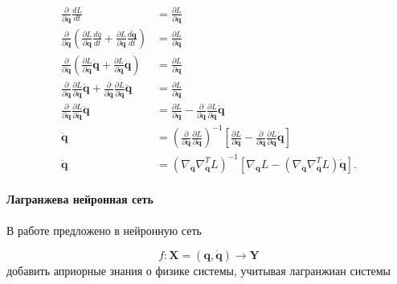 \documentclass[12pt, twoside]{article}
\begin{document}
        $$\begin{aligned}
            \frac{\partial}{\partial \dot{\mathbf{q}}} \frac{dL}{dt} &= \frac{\partial L}{\partial \mathbf{q}}\\
            \frac{\partial}{\partial \dot{\mathbf{q}}} \left( \frac{\partial L}{\partial \mathbf{q}} \frac{dq}{dt} + \frac{\partial L}{\partial \dot{\mathbf{q}}} \frac{d\dot{\mathbf{q}}}{dt} \right) &= \frac{\partial L}{\partial \mathbf{q}} \\
            \frac{\partial}{\partial \dot{\mathbf{q}}} \left( \frac{\partial L}{\partial \mathbf{q}} \dot{\mathbf{q}} + \frac{\partial L}{\partial \dot{\mathbf{q}}} \ddot{\mathbf{q}} \right) &= \frac{\partial L}{\partial \mathbf{q}} \\ 
            \frac{\partial}{\partial \dot{\mathbf{q}}} \frac{\partial L}{\partial \mathbf{q}} \dot{\mathbf{q}} + \frac{\partial}{\partial \dot{\mathbf{q}}} \frac{\partial L}{\partial \dot{\mathbf{q}}} \ddot{\mathbf{q}} &= \frac{\partial L}{\partial \mathbf{q}} \\
            \frac{\partial}{\partial \dot{\mathbf{q}}} \frac{\partial L}{\partial \dot{\mathbf{q}}} \ddot{\mathbf{q}} &= \frac{\partial L}{\partial \mathbf{q}} - \frac{\partial}{\partial \dot{\mathbf{q}}} \frac{\partial L}{\partial \mathbf{q}} \dot{\mathbf{q}} \\
            \ddot{\mathbf{q}} &= \left( \frac{\partial}{\partial \dot{\mathbf{q}}} \frac{\partial L}{\partial \dot{\mathbf{q}}} \right)^{-1} \left[ \frac{\partial L}{\partial \mathbf{q}} - \frac{\partial}{\partial \dot{\mathbf{q}}} \frac{\partial L}{\partial \mathbf{q}} \dot{\mathbf{q}} \right] \\
            \ddot{\mathbf{q}} &= \left( \nabla_{\dot{\mathbf{q}}} \nabla_{\dot{\mathbf{q}}}^T L \right)^{-1} \left[ \nabla_{\mathbf{q}} L - \left( \nabla_{\dot{\mathbf{q}}} \nabla_{\mathbf{q}}^T L \right) \dot{\mathbf{q}} \right].
        \end{aligned}$$

    \paragraph{Лагранжева нейронная сеть}

        В работе \cite{cranmer2020lagrangian} предложено в нейронную сеть

        $$f: \mathbf{X} = (\mathbf{q}, \mathbf{\dot{q}}) \rightarrow \mathbf{Y}$$
        добавить априорные знания о физике системы, учитывая лагранжиан системы
    
\end{document}
